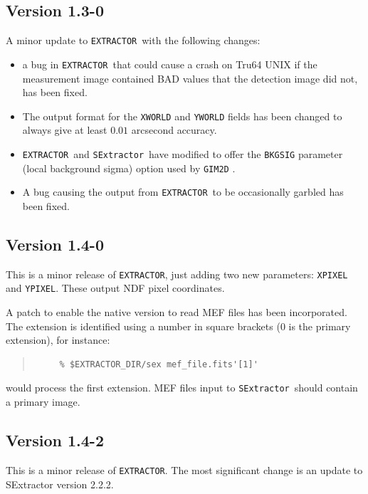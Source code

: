 \documentclass[twoside,11pt]{article}
\renewcommand{\_}{\texttt{\symbol{95}}}
\newcommand{\EXTRACTOR}{\texttt{EXTRACTOR}}
\newcommand{\SExtractor}{\texttt{SExtractor}}
\begin{document}
\subsection{Version 1.3-0}
A minor update to \EXTRACTOR\ with the following changes:
\begin{itemize}
   \item a bug in \EXTRACTOR\ that could cause a crash on Tru64 UNIX if
       the measurement image contained BAD values that the detection
       image did not, has been fixed.

    \item The output format for the \texttt{X\_WORLD} and
          \texttt{Y\_WORLD} fields has been changed to always give at
           least $0.01$ arcsecond accuracy.

    \item \EXTRACTOR\ and \SExtractor\ have modified to offer the
       \texttt{BKGSIG} parameter (local background sigma) option used
       by \texttt{GIM2D} .

     \item A bug causing the output from \EXTRACTOR\ to be occasionally
       garbled has been fixed.
\end{itemize}

\subsection{Version 1.4-0}
 This is a minor release of \EXTRACTOR, just adding two new parameters:
 \texttt{X\_PIXEL} and \texttt{Y\_PIXEL}. These output NDF pixel coordinates.

 A patch to enable the native version to read MEF files has been
 incorporated. The extension is identified using a number in square
 brackets (0 is the primary extension), for instance:
 \begin{quote}
 \begin{verbatim}
     % $EXTRACTOR_DIR/sex mef_file.fits'[1]'
 \end{verbatim}
 \end{quote}
 would process the first extension. MEF files input to
 \SExtractor\ should contain a primary image.

\subsection{Version 1.4-2}

 This is a minor release of \EXTRACTOR. The most significant change
 is an update to SExtractor version 2.2.2.
\end{document}
